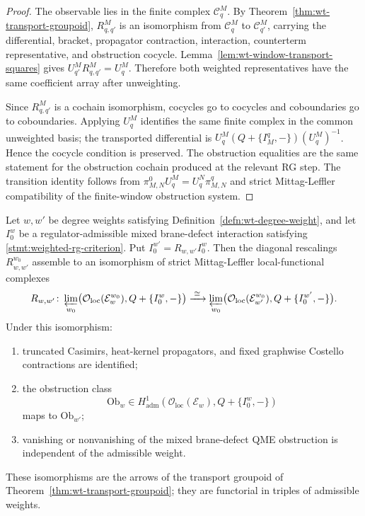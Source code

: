 \begin{proof}
  The observable lies in the finite complex \(\mathcal C^M_q\).  By
  Theorem~\ref{thm:wt-transport-groupoid}, \(R^M_{q,q'}\) is an
  isomorphism from \(\mathcal C^M_q\) to \(\mathcal C^M_{q'}\),
  carrying the differential, bracket, propagator contraction,
  interaction, counterterm representative, and obstruction cocycle.
  Lemma~\ref{lem:wt-window-transport-squares} gives
  \(U^M_{q'}R^M_{q,q'}=U^M_q\).  Therefore both weighted
  representatives have the same coefficient array after unweighting.

  Since \(R^M_{q,q'}\) is a cochain isomorphism, cocycles go to
  cocycles and coboundaries go to coboundaries.  Applying \(U^M_q\)
  identifies the same finite complex in the common unweighted basis;
  the transported differential is
  \(U^M_q(Q+\{I^q_M,-\})(U^M_q)^{-1}\).  Hence the cocycle condition is
  preserved.  The obstruction equalities are the same statement for
  the obstruction cochain produced at the relevant RG step.  The
  transition identity follows from
  \(\pi^0_{M,N}U^M_q=U^N_q\pi^q_{M,N}\) and strict
  Mittag-Leffler compatibility of the finite-window obstruction system.
\end{proof}

\begin{thm}\label{thm:wt-regulator-independence-admissible}
  Let \(w,w'\) be degree weights satisfying
  Definition~\ref{defn:wt-degree-weight}, and let \(I_0^w\) be a
	  regulator-admissible mixed brane-defect interaction satisfying
	  \ref{stmt:weighted-rg-criterion}.  Put
  \(I_0^{w'}=R_{w,w'}I_0^w\).  Then the diagonal rescalings
  \(R_{w,w'}^{w_0}\) assemble to an isomorphism of strict
  Mittag-Leffler local-functional complexes
  \[
    R_{w,w'}\colon
    \varprojlim_{w_0}
    \bigl(\mathcal O_{\mathrm{loc}}(\mathcal E_w^{w_0}),
      Q+\{I_0^w,-\}\bigr)
    \xrightarrow{\;\cong\;}
    \varprojlim_{w_0}
    \bigl(\mathcal O_{\mathrm{loc}}(\mathcal E_{w'}^{w_0}),
      Q+\{I_0^{w'},-\}\bigr).
  \]
  Under this isomorphism:
  \begin{enumerate}[label=(\roman*)]
    \item truncated Casimirs, heat-kernel propagators, and fixed
      graphwise Costello contractions are identified;
    \item the obstruction class
      \[
        \mathrm{Ob}_w\in
        H^1_{\mathrm{adm}}(\mathcal O_{\mathrm{loc}}(\mathcal E_w),
          Q+\{I_0^w,-\})
      \]
      maps to \(\mathrm{Ob}_{w'}\);
    \item vanishing or nonvanishing of the mixed brane-defect QME
      obstruction is independent of the admissible weight.
  \end{enumerate}
  These isomorphisms are the arrows of the transport groupoid of
  Theorem~\ref{thm:wt-transport-groupoid}; they are functorial in
  triples of admissible weights.
\end{thm}


